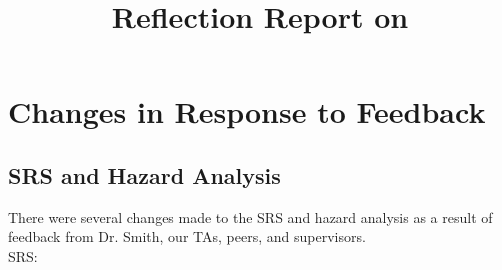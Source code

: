 \documentclass{article}
\title{Reflection Report on \progname}
\author{\authname}
\date{}
\begin{document}
\maketitle


\section{Changes in Response to Feedback}




\subsection{SRS and Hazard Analysis}

There were several changes made to the SRS and hazard analysis as a result of feedback from Dr. Smith, our TAs, peers, and supervisors.\\

SRS:
\end{document}
